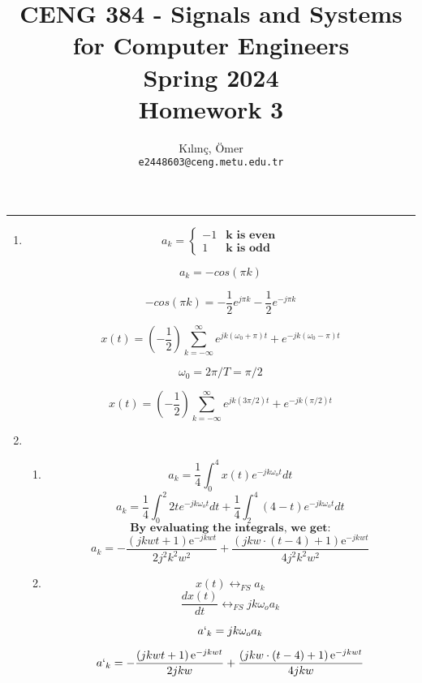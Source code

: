 \documentclass[10pt,a4paper, margin=1in]{article}
\author{
  Kılınç, Ömer\\
  \texttt{e2448603@ceng.metu.edu.tr}
}
\title{CENG 384 - Signals and Systems for Computer Engineers \\
Spring 2024 \\
Homework 3}
\begin{document}
\maketitle



\noindent\rule{19cm}{1.2pt}

\begin{enumerate}

\item %
    \[ a_k = \begin{cases} 
        -1 & \textbf{k is even} \\
        1 & \textbf{k is odd}
        \end{cases}
    \]

    \[ a_k = -cos(\pi k) \]

    \[ -cos(\pi k) = - \frac{1}{2} e^{j \pi k} - \frac{1}{2} e^{-j \pi k} \]

    \[ x(t) = (-\frac{1}{2})  \sum_{k=-\infty}^{\infty}  e^{j k(\omega_0 + \pi) t} + e^{- j k (\omega_0 - \pi) t} \]

    \[\omega_0 = 2\pi / T = \pi / 2 \]

    \[ x(t) = (-\frac{1}{2})  \sum_{k=-\infty}^{\infty}  e^{j k(3\pi / 2) t} + e^{- j k (\pi / 2) t} \]

\item %
	\begin{enumerate}
    \item %
  
    \[ a_k =  \frac{1}{4} \int^4_0 x(t) e^{-jk \omega_o t } dt \]
    \[ a_k =  \frac{1}{4} \int^2_0 2t e^{-j k \omega_o t } dt + \frac{1}{4} \int^4_2 (4-t) e^{-j k \omega_o t }dt \]
    \[ \textbf{By evaluating the integrals, we get:} \]
    \[ a_k = -\dfrac{\left(jkwt+1\right)\mathrm{e}^{-jkwt}}{2j^2k^2w^2}+ \dfrac{\left(jkw\cdot\left(t-4\right)+1\right)\mathrm{e}^{-jkwt}}{4j^2k^2w^2}\]

    
    \item %
    \[x(t)  \longleftrightarrow_{FS} a_k\]
    \[\frac{dx(t)}{dt} \longleftrightarrow_{FS} jk\omega_o a_k\]

    \[{a`}_k = jk\omega_o a_k \]
    
    \[ {a`}_k = -\dfrac{\left(jkwt+1\right)\mathrm{e}^{-jkwt}}{2jkw}+ \dfrac{\left(jkw\cdot\left(t-4\right)+1\right)\mathrm{e}^{-jkwt}}{4jkw} \]
    
    \end{enumerate}







\end{enumerate}
\end{document}
